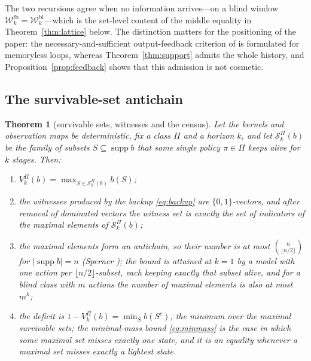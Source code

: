 \documentclass[11pt,a4paper]{article}
\theoremstyle{plain}
\newtheorem{theorem}{Theorem}[section]
\theoremstyle{definition}
\theoremstyle{remark}
\newcommand{\calS}{\mathcal{S}}
\newcommand{\calW}{\mathcal{W}}
\newcommand{\Wfb}{\calW^{\mathrm{fb}}}
\newcommand{\Wbl}{\calW^{\mathrm{bl}}}
\newcommand{\supp}{\operatorname{supp}}
\begin{document}
The two recursions agree when no information arrives---on a blind window $\Wfb_k=\Wbl_k$---which is the set-level content of the middle equality in Theorem~\ref{thm:lattice} below. The distinction matters for the positioning of the paper: the necessary-and-sufficient output-feedback criterion of \cite{Doyen2000} is formulated for memoryless loops, whereas Theorem~\ref{thm:support} admits the whole history, and Proposition~\ref{prop:feedback} shows that this admission is not cosmetic.

\subsection{The survivable-set antichain}

\begin{theorem}[survivable sets, witnesses and the census]\label{thm:antichain}
Let the kernels and observation maps be deterministic, fix a class $\Pi$ and a horizon $k$, and let $\calS^{\Pi}_k(b)$ be the family of subsets $S\subseteq\supp b$ that some single policy $\pi\in\Pi$ keeps alive for $k$ stages. Then:
\begin{enumerate}[leftmargin=1.6em,itemsep=1pt]
\item[(i)] $V^{\Pi}_k(b)=\max_{S\in\calS^{\Pi}_k(b)}b(S)$;
\item[(ii)] the witnesses produced by the backup \eqref{eq:backup} are $\{0,1\}$-vectors, and after removal of dominated vectors the witness set is exactly the set of indicators of the maximal elements of $\calS^{\Pi}_k(b)$;
\item[(iii)] the maximal elements form an antichain, so their number is at most $\binom{n}{\lfloor n/2\rfloor}$ for $|\supp b|=n$ (Sperner \cite{Sperner1928}); the bound is attained at $k=1$ by a model with one action per $\lfloor n/2\rfloor$-subset, each keeping exactly that subset alive, and for a blind class with $m$ actions the number of maximal elements is also at most $m^{k}$;
\item[(iv)] the deficit is $1-V^{\Pi}_k(b)=\min_S b(S^{c})$, the minimum over the maximal survivable sets; the minimal-mass bound \eqref{eq:minmass} is the case in which some maximal set misses exactly one state, and it is an equality whenever a maximal set misses exactly a lightest state.
\end{enumerate}
\end{theorem}
\end{document}
